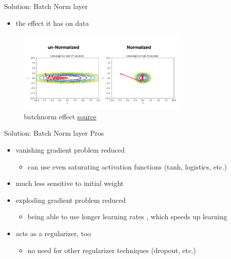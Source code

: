 \begin{frame}{Solution: Batch Norm layer}
	\begin{itemize}
		\item the effect it has on data
	\end{itemize}
	\begin{figure}[H]
		\centering
		\includegraphics[width=0.75\textwidth]{Figs/section_4/batchnorm_3.png}
		\caption{batchnorm effect \href{https://jsideas.net/batch_normalization/}{source}}
	\end{figure}
\end{frame}
\begin{frame}{Solution: Batch Norm layer}
	Pros
	\begin{itemize}
		\item vanishing gradient problem reduced
		\begin{itemize}
			\item can use even saturating activation functions (tanh, logistics, etc.)
		\end{itemize}
		\item much less sensitive to initial weight
		\item exploding gradient problem reduced
		\begin{itemize}
			\item being able to use longer learning rates , which speeds up learning
		\end{itemize}
		\item acts as a regularizer, too
		\begin{itemize}
			\item no need for other regularizer techniques (dropout, etc.)
		\end{itemize}
	\end{itemize}
\end{frame}
